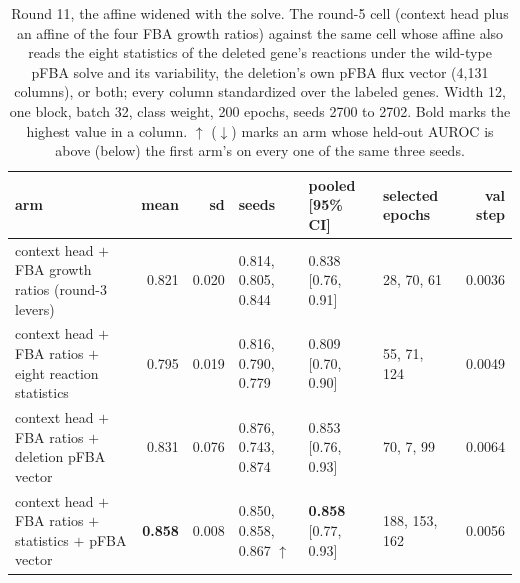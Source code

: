 \begin{table}[H]
  \centering
  \footnotesize
  \setlength{\tabcolsep}{3pt}
  \caption[Round 11, the affine widened with the solve]{Round 11, the affine widened with the solve. The round-5 cell (context head plus an affine of the four FBA growth ratios) against the same cell whose affine also reads the eight statistics of the deleted gene's reactions under the wild-type pFBA solve and its variability, the deletion's own pFBA flux vector (4,131 columns), or both; every column standardized over the labeled genes. Width 12, one block, batch 32, class weight, 200 epochs, seeds 2700 to 2702. Bold marks the highest value in a column. $\uparrow$ ($\downarrow$) marks an arm whose held-out AUROC is above (below) the first arm's on every one of the same three seeds.}
  \label{tab:w22}
  \begin{tabular}{@{}lrrlllr@{}}
    \hline
    arm & mean & sd & seeds & pooled [95\% CI] & selected epochs & val step \\
    \hline
    context head $+$ FBA growth ratios (round-3 levers) & 0.821 & 0.020 & 0.814, 0.805, 0.844 & 0.838 [0.76, 0.91] & 28, 70, 61 & 0.0036 \\
    context head $+$ FBA ratios $+$ eight reaction statistics & 0.795 & 0.019 & 0.816, 0.790, 0.779 & 0.809 [0.70, 0.90] & 55, 71, 124 & 0.0049 \\
    context head $+$ FBA ratios $+$ deletion pFBA vector & 0.831 & 0.076 & 0.876, 0.743, 0.874 & 0.853 [0.76, 0.93] & 70, 7, 99 & 0.0064 \\
    context head $+$ FBA ratios $+$ statistics $+$ pFBA vector & \textbf{0.858} & 0.008 & 0.850, 0.858, 0.867 $\uparrow$ & \textbf{0.858} [0.77, 0.93] & 188, 153, 162 & 0.0056 \\
    \hline
  \end{tabular}
\end{table}
